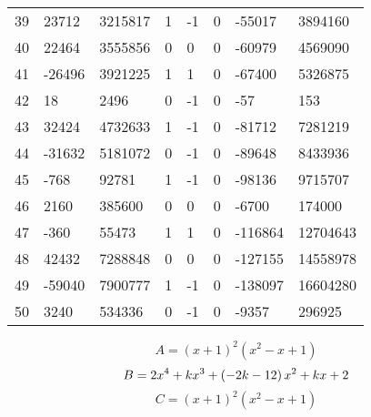 \documentclass{amsart}
\begin{document}
\begin{longtable}{|l|l|l|lllll|}
39&23712&3215817&1&-1&0&-55017&3894160\\
40&22464&3555856&0&0&0&-60979&4569090\\
41&-26496&3921225&1&1&0&-67400&5326875\\
42&18&2496&0&-1&0&-57&153\\
43&32424&4732633&1&-1&0&-81712&7281219\\
44&-31632&5181072&0&-1&0&-89648&8433936\\
45&-768&92781&1&-1&0&-98136&9715707\\
46&2160&385600&0&0&0&-6700&174000\\
47&-360&55473&1&1&0&-116864&12704643\\
48&42432&7288848&0&0&0&-127155&14558978\\
49&-59040&7900777&1&-1&0&-138097&16604280\\
50&3240&534336&0&-1&0&-9357&296925\\
\hline
\end{longtable}
$$A=(x
 + 1)^{2}(x^2
 - x
 + 1)$$
$$B=2\*x^4
 + k\*x^3
 + \left(-2\*k
 - 12\right) \*x^2
 + k\*x
 + 2$$
$$C=(x
 + 1)^{2}(x^2
 - x
 + 1)$$
\end{document}
